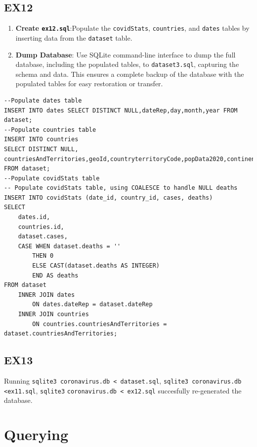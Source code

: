 \documentclass[12pt,oneside,a4paper,english]{article}
\begin{document}
\subsection{EX12}
\begin{enumerate}
    \item \textbf{Create \texttt{ex12.sql}}:Populate the \texttt{covidStats}, \texttt{countries}, and \texttt{dates} tables by inserting data from the \texttt{dataset} table.
    \item \textbf{Dump Database}: Use SQLite command-line interface to dump the full database, including the populated tables, to \texttt{dataset3.sql}, capturing the schema and data. This ensures a complete backup of the database with the populated tables for easy restoration or transfer.
\end{enumerate}
\begin{lstlisting}
--Populate dates table
INSERT INTO dates SELECT DISTINCT NULL,dateRep,day,month,year FROM dataset;
--Populate countries table
INSERT INTO countries
SELECT DISTINCT NULL,
countriesAndTerritories,geoId,countryterritoryCode,popData2020,continentExp
FROM dataset;
--Populate covidStats table
-- Populate covidStats table, using COALESCE to handle NULL deaths
INSERT INTO covidStats (date_id, country_id, cases, deaths)
SELECT
    dates.id,
    countries.id,
    dataset.cases,
    CASE WHEN dataset.deaths = ''
        THEN 0
        ELSE CAST(dataset.deaths AS INTEGER)
        END AS deaths
FROM dataset
    INNER JOIN dates
        ON dates.dateRep = dataset.dateRep
    INNER JOIN countries
        ON countries.countriesAndTerritories = dataset.countriesAndTerritories;
\end{lstlisting}

\subsection{EX13}
Running \texttt{sqlite3 coronavirus.db < dataset.sql}, \texttt{sqlite3 coronavirus.db <ex11.sql}, \newline\texttt{sqlite3} \texttt{coronavirus.db < ex12.sql} succesfully re-generated the database.






\section{Querying}
\end{document}
